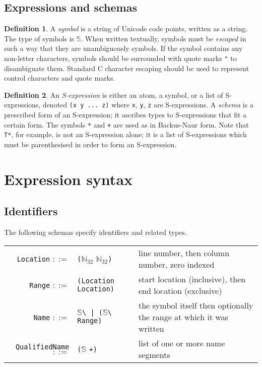 \documentclass[UKenglish, 11pt, a4paper, parskip=half]{scrbook}
\newcommand{\code}[1]{\lstinline{#1}}
\theoremstyle{definition}
\newtheorem*{definition}{Definition}
\begin{document}
\subsection{Expressions and schemas}
\begin{definition}
    A \textit{symbol} is a string of Unicode code points, written as a string.
    The type of symbols is \( \mathbb S \).
    When written textually, symbols must be \textit{escaped} in such a way that they are unambiguously symbols.
    If the symbol contains any non-letter characters, symbols should be surrounded with quote marks \code{"} to disambiguate them.
    Standard C character escaping should be used to represent control characters and quote marks.
\end{definition}
\begin{definition}
    An \textit{S-expression} is either an atom, a symbol, or a list of S-expressions, denoted \code{(x y ... z)} where \code{x}, \code{y}, \code{z} are S-expressions.
    A \textit{schema} is a prescribed form of an S-expression; it ascribes types to S-expressions that fit a certain form.
    The symbols \code{*} and \code{+} are used as in Backus-Naur form.
    Note that \code{T*}, for example, is not an S-expression alone; it is a list of S-expressions which must be parenthesised in order to form an S-expression.
\end{definition}

\section{Expression syntax}

\subsection{Identifiers}

The following schemas specify identifiers and related types.

\begin{tabular}{r l p{6cm}}
    \code{Location} \( ::= \) & \code{(}\( \mathbb N_{32} \) \( \mathbb N_{32} \)\code{)} & line number, then column number, zero indexed \\
    \code{Range} \( ::= \) & \code{(Location Location)} & start location (inclusive), then end location (exclusive) \\
    \code{Name} \( ::= \) & \( \mathbb S \)\code{\ | (}\( \mathbb S \)\code{\ Range)} & the symbol itself then optionally the range at which it was written \\
    \code{QualifiedName} \( ::= \) & \code{(}\( \mathbb S \) \code{+)} & list of one or more name segments
\end{tabular}
\end{document}

